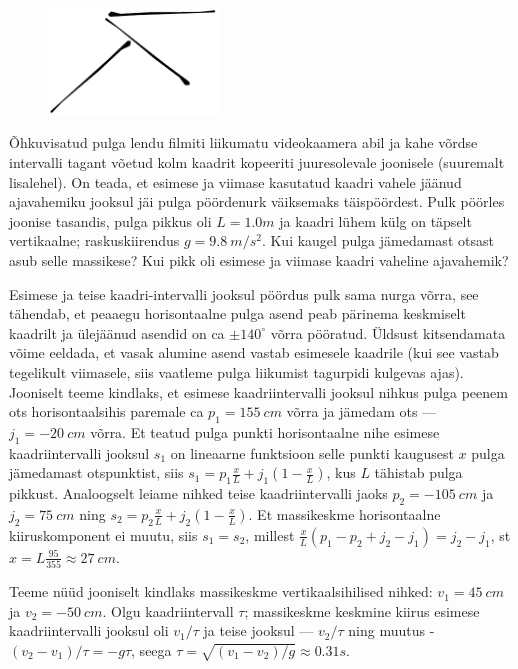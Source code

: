
\begin{figure}
	\vspace{-15pt}
	\begin{center}
		\includegraphics[width = 0.4\textwidth]{2018-lahg-10-yl.pdf}
	\end{center}
\end{figure}

Õhkuvisatud pulga lendu filmiti liikumatu videokaamera abil ja kahe võrdse intervalli tagant võetud kolm kaadrit kopeeriti juuresolevale joonisele (suuremalt lisalehel). On teada, et esimese ja viimase kasutatud kaadri vahele jäänud ajavahemiku jooksul jäi pulga pöördenurk väiksemaks täispöördest. Pulk pöörles joonise tasandis, pulga pikkus oli $L=\SI{1.0}m$ ja kaadri lühem külg on täpselt vertikaalne; raskuskiirendus $g=\SI{9.8}{m/s^2}$. Kui kaugel pulga jämedamast otsast asub selle massikese? Kui pikk oli esimese ja viimase kaadri vaheline ajavahemik?\hint

\solu
Esimese ja teise kaadri-intervalli jooksul pöördus pulk sama nurga võrra, see tähendab, et peaaegu horisontaalne pulga asend peab pärinema keskmiselt kaadrilt ja ülejäänud asendid on ca $\pm 140^\circ$ võrra pööratud. Üldsust kitsendamata võime eeldada, et vasak alumine asend vastab esimesele kaadrile (kui see vastab tegelikult viimasele, siis vaatleme pulga liikumist tagurpidi kulgevas ajas). Jooniselt teeme kindlaks, et esimese kaadriintervalli jooksul nihkus pulga peenem ots horisontaalsihis paremale ca $p_1=\SI{155}{cm}$ võrra ja jämedam ots --- $j_1=\SI{-20}{cm}$  võrra. Et teatud pulga punkti horisontaalne nihe esimese kaadriintervalli jooksul $s_1$ on lineaarne funktsioon selle punkti kaugusest $x$ pulga jämedamast otspunktist, siis $s_1=p_1\frac xL+j_1(1-\frac xL)$, kus $L$ tähistab pulga pikkust. Analoogselt leiame nihked teise kaadriintervalli jaoks $p_2=\SI{-105}{cm}$ ja $j_2=\SI{75}{cm}$ ning $s_2=p_2\frac xL+j_2(1-\frac xL)$. Et massikeskme horisontaalne kiiruskomponent ei muutu, siis $s_1=s_2$, millest $\frac xL(p_1-p_2+j_2-j_1)=j_2-j_1$, st $x=L\frac{95}{355}\approx \SI{27}{cm}$.

Teeme nüüd jooniselt kindlaks massikeskme vertikaalsihilised nihked: $v_1=\SI{45}{cm}$ ja $v_2=\SI{-50}{cm}$.
Olgu kaadriintervall $\tau$; massikeskme keskmine kiirus esimese kaadriintervalli jooksul oli $v_1/\tau$ ja teise jooksul --- $v_2/\tau$ ning muutus - $(v_2-v_1)/\tau= -g\tau$, seega $\tau=\sqrt{(v_1-v_2)/g}\approx \SI{0.31}s$.
\probend